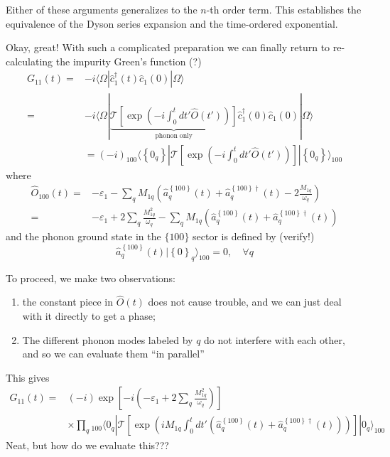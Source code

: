 Either of these arguments generalizes to the $n$-th order term. This establishes the equivalence of the Dyson series expansion and the time-ordered exponential.

Okay, great! With such a complicated preparation we can finally return to re-calculating the impurity Green's function (?)
\begin{align*}
    G_{11}\left( t \right) =&-i\langle \Omega |\hat{c}_{1}^{\dagger}\left( t \right) \hat{c}_1\left( 0 \right) |\Omega \rangle \\
    =&-i\langle \Omega |\underset{\mathrm{phonon}\;\mathrm{only}}{\underbrace{\mathcal{T} \left[ \exp \left( -i\int_0^t{dt'\hat{O}\left( t' \right)} \right) \right] }}\hat{c}_{1}^{\dagger}\left( 0 \right) \hat{c}_1\left( 0 \right) |\Omega \rangle \\
    &=\left( -i \right) _{100}\langle \left\{ 0_q \right\} |\mathcal{T} \left[ \exp \left( -i\int_0^t{dt'\hat{O}\left( t' \right)} \right) \right] |\left\{ 0_q \right\} \rangle _{100}
\end{align*}
where
\begin{align*}
    \hat{O}_{100}\left( t \right) =&-\varepsilon _1-\sum_q{M_{1q}\left( \hat{a}_{q}^{\left\{ 100 \right\}}\left( t \right) +\hat{a}_{q}^{\left\{ 100 \right\} \dagger}\left( t \right) -2\frac{M_{1q}}{\omega _q} \right)}\\
    =&-\varepsilon _1+2\sum_q{\frac{M_{1q}^2}{\omega _q}}-\sum_q{M_{1q}\left( \hat{a}_{q}^{\left\{ 100 \right\}}\left( t \right) +\hat{a}_{q}^{\left\{ 100 \right\} \dagger}\left( t \right) \right)}
\end{align*}
and the phonon ground state in the $\{100\}$ sector is defined by (verify!)
\[ \hat{a}_{q}^{\left\{ 100 \right\}}\left( t \right) |\left\{ 0 \right\} _q\rangle _{100}=0,\quad \forall q\]

To proceed, we make two observations:
\begin{enumerate}
    \item the constant piece in $\hat{O}(t)$ does not cause trouble, and we can just deal with it  directly to get a phase;
    \item The different phonon modes labeled by $q$ do not interfere with each other, and so we can evaluate them ``in parallel''
\end{enumerate}

This gives
\begin{align*}
    G_{11}\left( t \right) =&\left( -i \right) \exp \left[ -i\left( -\varepsilon _1+2\sum_q{\frac{M_{1q}^{2}}{\omega _q}} \right) \right] \\
    &\times \prod_q{_{100}\langle 0_q|\mathcal{T} \left[ \exp \left( iM_{1q}\int_0^t{dt'\left( \hat{a}_{q}^{\left\{ 100 \right\}}\left( t \right) +\hat{a}_{q}^{\left\{ 100 \right\} \dagger}\left( t \right) \right)} \right) \right] |0_q\rangle _{100}}
\end{align*}
Neat, but how do we evaluate this???

